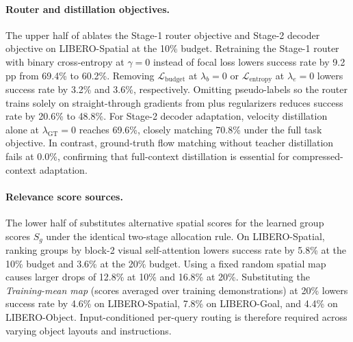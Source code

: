 

\paragraph{Router and distillation objectives.}
    The upper half of  ablates the Stage-1 router objective and Stage-2 decoder objective on LIBERO-Spatial at the 10\% budget.
    Retraining the Stage-1 router with binary cross-entropy at $\gamma=0$ instead of focal loss lowers success rate by 9.2 pp from 69.4\% to 60.2\%.
    Removing $\mathcal{L}_{\text{budget}}$ at $\lambda_b=0$ or $\mathcal{L}_{\text{entropy}}$ at $\lambda_e=0$ lowers success rate by 3.2\% and 3.6\%, respectively.
    Omitting pseudo-labels so the router trains solely on straight-through gradients from  plus regularizers reduces success rate by 20.6\% to 48.8\%.
    For Stage-2 decoder adaptation, velocity distillation alone at $\lambda_{\text{GT}}=0$ reaches 69.6\%, closely matching 70.8\% under the full task objective.
    In contrast, ground-truth flow matching without teacher distillation fails at 0.0\%, confirming that full-context distillation is essential for compressed-context adaptation.

\paragraph{Relevance score sources.}
    The lower half of  substitutes alternative spatial scores for the learned group scores $S_g$ under the identical two-stage allocation rule.
    On LIBERO-Spatial, ranking groups by block-2 visual self-attention lowers success rate by 5.8\% at the 10\% budget and 3.6\% at the 20\% budget.
    Using a fixed random spatial map causes larger drops of 12.8\% at 10\% and 16.8\% at 20\%.
    Substituting the \emph{Training-mean map} (scores averaged over training demonstrations) at 20\% lowers success rate by 4.6\% on LIBERO-Spatial, 7.8\% on LIBERO-Goal, and 4.4\% on LIBERO-Object.
    Input-conditioned per-query routing is therefore required across varying object layouts and instructions.





